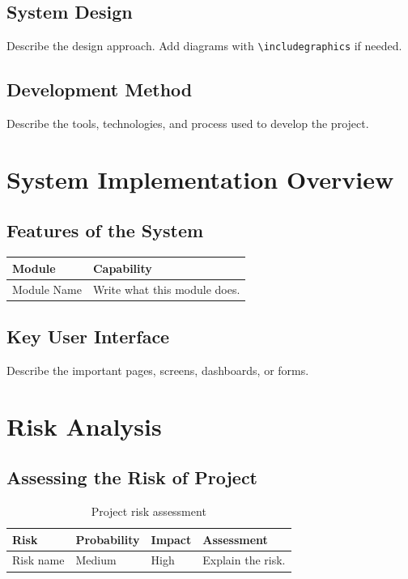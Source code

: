 \documentclass[12pt,a4paper]{report}
\begin{document}
\section{System Design}
Describe the design approach. Add diagrams with \verb|\includegraphics| if needed.

\section{Development Method}
Describe the tools, technologies, and process used to develop the project.

\chapter{System Implementation Overview}
\section{Features of the System}
\begin{longtable}{p{4cm}p{10cm}}
\toprule
\textbf{Module} & \textbf{Capability} \\
\midrule
Module Name & Write what this module does. \\
\bottomrule
\end{longtable}

\section{Key User Interface}
Describe the important pages, screens, dashboards, or forms.

\chapter{Risk Analysis}
\section{Assessing the Risk of Project}
\begin{table}[H]
\centering
\begin{tabularx}{\textwidth}{|p{3.2cm}|C{2.2cm}|C{2cm}|Y|}
\hline
{}
\textbf{Risk} & \textbf{Probability} & \textbf{Impact} & \textbf{Assessment} \\
\hline
Risk name & Medium & High & Explain the risk. \\
\hline
\end{tabularx}
\caption{Project risk assessment}
\end{table}
\end{document}
